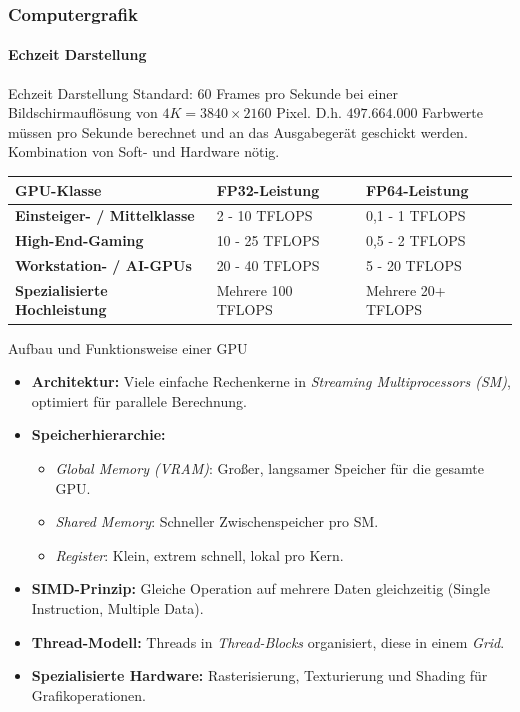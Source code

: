 \documentclass{beamer}
\begin{document}
\begin{frame}
    \frametitle{Computergrafik}
\framesubtitle{Echzeit Darstellung}
    \begin{block}{Echzeit Darstellung}
Standard: $60$ Frames pro Sekunde bei einer Bildschirmauflösung von $4K=3840 \times 2160$ Pixel.  
D.h. $497.664.000$ Farbwerte müssen pro Sekunde berechnet und an das Ausgabegerät
geschickt werden. 
Kombination von Soft- und Hardware nötig.
\end{block}
\begin{table}[h]
    \centering
    \tiny %
    \begin{tabular}{|l|l|l|}
    \hline
    \textbf{GPU-Klasse} & \textbf{FP32-Leistung} & \textbf{FP64-Leistung} \\ \hline
    \textbf{Einsteiger- / Mittelklasse} & 2 - 10 TFLOPS & 0,1 - 1 TFLOPS \\ \hline
    \textbf{High-End-Gaming} & 10 - 25 TFLOPS & 0,5 - 2 TFLOPS \\ \hline
    \textbf{Workstation- / AI-GPUs} & 20 - 40 TFLOPS & 5 - 20 TFLOPS \\ \hline
    \textbf{Spezialisierte Hochleistung} & Mehrere 100 TFLOPS & Mehrere 20+ TFLOPS \\ \hline
    \end{tabular}
    \end{table}

\end{frame}




\begin{frame}{Aufbau und Funktionsweise einer GPU}
    \begin{itemize}
      \item \textbf{Architektur:} Viele einfache Rechenkerne in \textit{Streaming Multiprocessors (SM)}, optimiert für parallele Berechnung.
      \item \textbf{Speicherhierarchie:}
      \begin{itemize}
        \item \textit{Global Memory (VRAM)}: Großer, langsamer Speicher für die gesamte GPU.
        \item \textit{Shared Memory}: Schneller Zwischenspeicher pro SM.
        \item \textit{Register}: Klein, extrem schnell, lokal pro Kern.
      \end{itemize}
      \item \textbf{SIMD-Prinzip:} Gleiche Operation auf mehrere Daten gleichzeitig (Single Instruction, Multiple Data).
      \item \textbf{Thread-Modell:} Threads in \textit{Thread-Blocks} organisiert, diese in einem \textit{Grid}.
      \item \textbf{Spezialisierte Hardware:} Rasterisierung, Texturierung und Shading für Grafikoperationen.
    \end{itemize}
  \end{frame}
\end{document}
